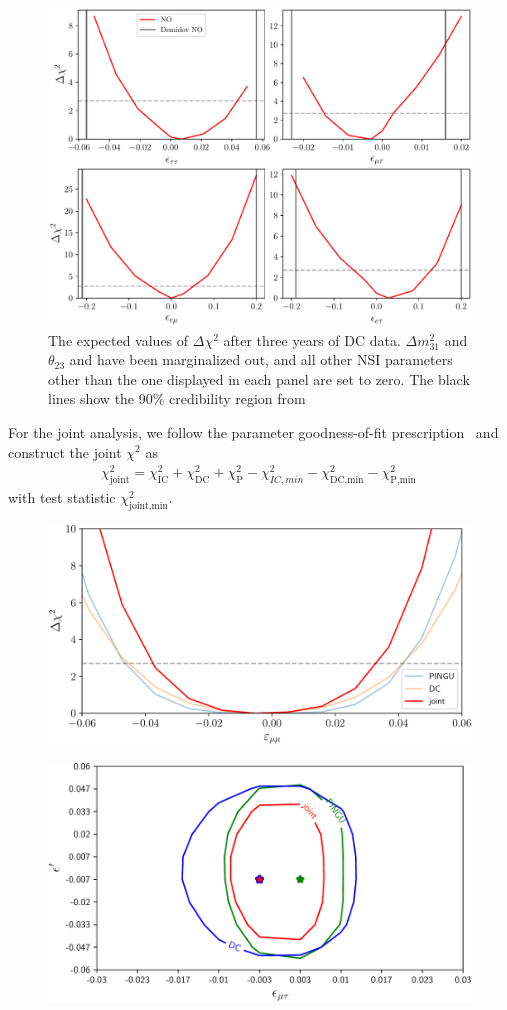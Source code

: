 \documentclass[draft=True]{revtex4-2}
\newcommand{\emm}{\ensuremath{\epsilon_{\mu\mu}}}
\newcommand{\dm}{\Delta m^2_{31}}
\begin{document}
 \begin{figure}[!tb]
    \begin{center}
      \includegraphics[width=0.6\linewidth]{figures/DC_3D_NO.pdf}
    \end{center}
    \caption{The expected values of $\Delta \chi^2$ after three years of DC data. $\dm$ and $\theta_{23}$ and have been marginalized out, and all other NSI 
    parameters other than the one displayed in each panel are set to zero. The black lines show the 90\% credibility region from~\cite{demidov}}\label{fig:DC_3D}
 \end{figure}

For the joint analysis, we follow the parameter goodness-of-fit prescription~\cite{maltoni2003} and construct the joint $\chi^2$ as 
\begin{align}
    \chi^2_\text{joint} = \chi^2_\text{IC} + \chi^2_\text{DC} + \chi^2_\text{P} - \chi^2_{IC,min} - \chi^2_\text{DC,min} - \chi^2_\text{P,min}\,
\end{align}
with test statistic $\chi^2_\text{joint,min}$.

\begin{figure}[!tb]
    \begin{center}
       \includegraphics[width=0.4\linewidth]{figures/emm_deltachi.pdf}
    \end{center}
    \caption{}\label{fig:emm_deltachi}
 \end{figure}

 \begin{figure}[!tb]
    \begin{center}
       \includegraphics[width=0.4\linewidth]{figures/emm_emp_contour.pdf}
    \end{center}
    \caption{}\label{fig:emm_emp_contour}
 \end{figure}
\end{document}

